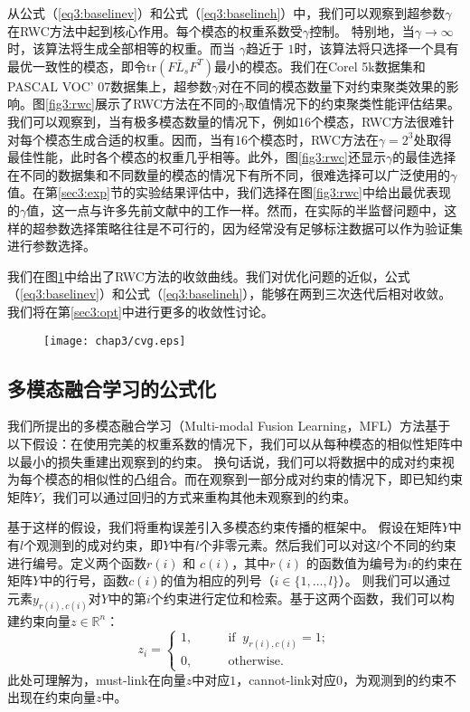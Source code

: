 从公式（\ref{eq3:baselinev}）和公式（\ref{eq3:baselineh}）中，我们可以观察到超参数$ \gamma $在RWC方法中起到核心作用。每个模态的权重系数受$ \gamma $控制。 特别地，当$ \gamma \rightarrow \infty$时，该算法将生成全部相等的权重。而当 $ \gamma $趋近于 $ 1 $时，该算法将只选择一个具有最优一致性的模态，即令$  \mathrm{tr}({F} \bar{{L}}_s{F}^T) $最小的模态。我们在Corel 5k数据集和PASCAL VOC' 07数据集上，超参数$\gamma$对在不同的模态数量下对约束聚类效果的影响。图\ref{fig3:rwc}展示了RWC方法在不同的$\gamma$取值情况下的约束聚类性能评估结果。我们可以观察到，当有极多模态数量的情况下，例如16个模态，RWC方法很难针对每个模态生成合适的权重。因而，当有16个模态时，RWC方法在$ \gamma = 2^3 $处取得最佳性能，此时各个模态的权重几乎相等。此外，图\ref{fig3:rwc}还显示$\gamma$的最佳选择在不同的数据集和不同数量的模态的情况下有所不同，很难选择可以广泛使用的$\gamma$值。在第\ref{sec3:exp}节的实验结果评估中，我们选择在图\ref{fig3:rwc}中给出最优表现的$ \gamma $值，这一点与许多先前文献中的工作一样。然而，在实际的半监督问题中，这样的超参数选择策略往往是不可行的，因为经常没有足够标注数据可以作为验证集进行参数选择。

我们在图\ref{fig3:cvg}中给出了RWC方法的收敛曲线。我们对优化问题的近似，公式（\ref{eq3:baselinev}）和公式（\ref{eq3:baselineh}），能够在两到三次迭代后相对收敛。我们将在第\ref{sec3:opt}中进行更多的收敛性讨论。

\begin{figure}[t]
	\centering
	\texttt{[image: chap3/cvg.eps]}
	\label{fig3:cvg}
\end{figure}

\subsection{多模态融合学习的公式化}
我们所提出的多模态融合学习（Multi-modal Fusion Learning，MFL）方法基于以下假设：在使用完美的权重系数的情况下，我们可以从每种模态的相似性矩阵中以最小的损失重建出观察到的约束。 换句话说，我们可以将数据中的成对约束视为每个模态的相似性的凸组合。而在观察到一部分成对约束的情况下，即已知约束矩阵$Y$，我们可以通过回归的方式来重构其他未观察到的约束。

基于这样的假设，我们将重构误差引入多模态约束传播的框架中。
假设在矩阵$Y$中有$l$个观测到的成对约束，即$Y$中有$l$个非零元素。然后我们可以对这$l$个不同的约束进行编号。定义两个函数$ r(i) $ 和 $ c(i) $，其中$ r(i) $ 的函数值为编号为$i$的约束在矩阵$Y$中的行号，函数$ c(i) $的值为相应的列号（$i \in \{1,\dots,l\}$）。
则我们可以通过元素$ y_{r(i),c(i)} $对$Y$中的第$i$个约束进行定位和检索。基于这两个函数，我们可以构建约束向量$ {z} \in \mathbb{R}^n$：
\begin{equation}
z_i = \begin{cases}1,\quad\quad &\text{if}\;\; y_{r(i),c(i)} =1; \\
0, \quad\quad &\text{otherwise}.
\end{cases}
\end{equation} 
此处可理解为，must-link在向量$z$中对应$1$，cannot-link对应$0$，为观测到的约束不出现在约束向量$z$中。

